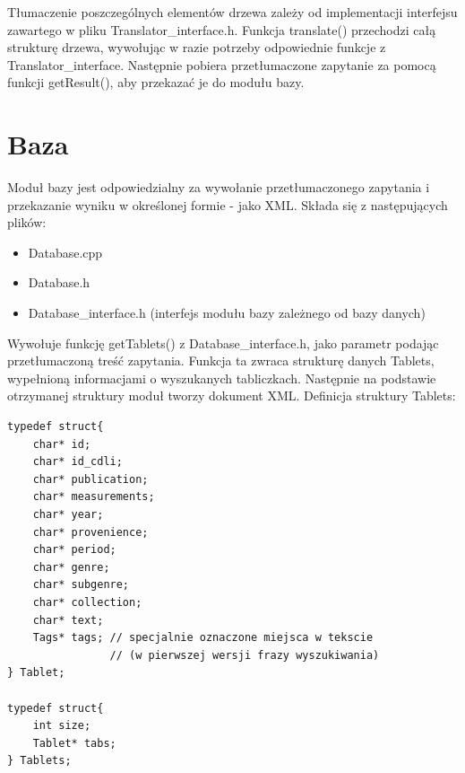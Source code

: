 Tłumaczenie poszczególnych elementów drzewa zależy od implementacji interfejsu zawartego w pliku Translator\_interface.h. 
Funkcja translate() przechodzi całą strukturę drzewa, wywołując w razie potrzeby odpowiednie funkcje z Translator\_interface.
Następnie pobiera przetłumaczone zapytanie za pomocą funkcji getResult(), aby przekazać je do modułu bazy.

\section{Baza}
Moduł bazy jest odpowiedzialny za wywołanie przetłumaczonego zapytania i przekazanie wyniku w określonej formie - jako XML.
Składa się z następujących plików:
\begin {itemize}
 \item Database.cpp
 \item Database.h
 \item Database\_interface.h (interfejs modułu bazy zależnego od bazy danych)
\end {itemize}

Wywołuje funkcję getTablets() z Database\_interface.h, jako parametr podając przetłumaczoną treść zapytania. 
Funkcja ta zwraca strukturę danych Tablets, wypełnioną informacjami o wyszukanych tabliczkach.
Następnie na podstawie otrzymanej struktury moduł tworzy dokument XML.
\newline
Definicja struktury Tablets:
\begin{verbatim}
typedef struct{    
    char* id;
    char* id_cdli;
    char* publication;
    char* measurements;
    char* year;
    char* provenience;
    char* period;
    char* genre;
    char* subgenre;
    char* collection;
    char* text;
    Tags* tags; // specjalnie oznaczone miejsca w tekscie
                // (w pierwszej wersji frazy wyszukiwania)
} Tablet;

typedef struct{
    int size;
    Tablet* tabs;
} Tablets;
\end{verbatim}



